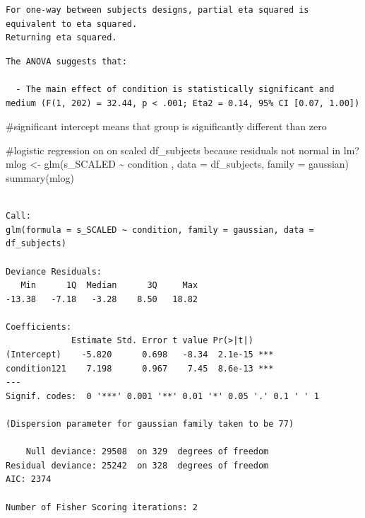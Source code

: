 \documentclass[
  letterpaper,
  DIV=11,
  numbers=noendperiod]{scrreprt}
\newenvironment{Shaded}{\begin{snugshade}}{\end{snugshade}}
\newcommand{\AttributeTok}[1]{\textcolor[rgb]{0.40,0.45,0.13}{#1}}
\newcommand{\CommentTok}[1]{\textcolor[rgb]{0.37,0.37,0.37}{#1}}
\newcommand{\FunctionTok}[1]{\textcolor[rgb]{0.28,0.35,0.67}{#1}}
\newcommand{\NormalTok}[1]{\textcolor[rgb]{0.00,0.23,0.31}{#1}}
\newcommand{\OtherTok}[1]{\textcolor[rgb]{0.00,0.23,0.31}{#1}}
\newcommand{\SpecialCharTok}[1]{\textcolor[rgb]{0.37,0.37,0.37}{#1}}
\begin{document}
\begin{verbatim}
For one-way between subjects designs, partial eta squared is equivalent to eta squared.
Returning eta squared.
\end{verbatim}

\begin{verbatim}
The ANOVA suggests that:

  - The main effect of condition is statistically significant and medium (F(1, 202) = 32.44, p < .001; Eta2 = 0.14, 95% CI [0.07, 1.00])
\end{verbatim}

\begin{Shaded}
\begin{Highlighting}[]
\CommentTok{\#significant intercept means that group is significantly different than zero}
\end{Highlighting}
\end{Shaded}

\begin{Shaded}
\begin{Highlighting}[]
\CommentTok{\#logistic regression on on scaled df\_subjects because residuals not normal in lm?}
\NormalTok{mlog }\OtherTok{\textless{}{-}} \FunctionTok{glm}\NormalTok{(s\_SCALED }\SpecialCharTok{\textasciitilde{}}\NormalTok{ condition , }\AttributeTok{data =}\NormalTok{ df\_subjects, }\AttributeTok{family =}\NormalTok{ gaussian)}
\FunctionTok{summary}\NormalTok{(mlog)}
\end{Highlighting}
\end{Shaded}

\begin{verbatim}

Call:
glm(formula = s_SCALED ~ condition, family = gaussian, data = df_subjects)

Deviance Residuals: 
   Min      1Q  Median      3Q     Max  
-13.38   -7.18   -3.28    8.50   18.82  

Coefficients:
             Estimate Std. Error t value Pr(>|t|)    
(Intercept)    -5.820      0.698   -8.34  2.1e-15 ***
condition121    7.198      0.967    7.45  8.6e-13 ***
---
Signif. codes:  0 '***' 0.001 '**' 0.01 '*' 0.05 '.' 0.1 ' ' 1

(Dispersion parameter for gaussian family taken to be 77)

    Null deviance: 29508  on 329  degrees of freedom
Residual deviance: 25242  on 328  degrees of freedom
AIC: 2374

Number of Fisher Scoring iterations: 2
\end{verbatim}
\end{document}
